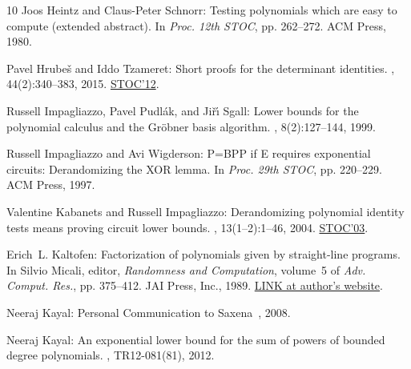 \documentclass[11pt]{article}
\numberwithin{equation}{section}
\theoremstyle{definition}
\theoremstyle{plain}
\begin{document}
\begin{thebibliography}{10}
{\sc Joos Heintz and Claus-Peter Schnorr}: Testing polynomials which are easy
  to compute (extended abstract).
\newblock In {\em Proc. 12th STOC}, pp. 262--272. ACM Press, 1980.
\newblock [\epfmtdoi{10.1145/800141.804674}]

{\sc Pavel Hrube\v{s} and Iddo Tzameret}: Short proofs for the determinant
  identities.
, 44(2):340--383, 2015.
\newblock \prelim \href{https://doi.org/10.1145/2213977.2213998}{STOC'12}.

{\sc Russell Impagliazzo, Pavel Pudl{\'{a}}k, and Ji{\v{r}}{\'{\i}} Sgall}:
  Lower bounds for the polynomial calculus and the {G}r{\"{o}}bner basis
  algorithm.
, 8(2):127--144, 1999.

{\sc Russell Impagliazzo and Avi Wigderson}: {P=BPP} if {E} requires
  exponential circuits: Derandomizing the {XOR} lemma.
\newblock In {\em Proc. 29th STOC}, pp. 220--229. ACM Press, 1997.
\newblock [\epfmtdoi{10.1145/258533.258590}]

{\sc Valentine Kabanets and Russell Impagliazzo}: Derandomizing polynomial
  identity tests means proving circuit lower bounds.
, 13(1--2):1--46, 2004.
\newblock \prelim \href{https://doi.org/10.1145/780542.780595}{STOC'03}.
\newblock [\epfmtdoi{10.1007/s00037-004-0182-6}]

{\sc Erich~L. Kaltofen}: Factorization of polynomials given by straight-line
  programs.
\newblock In {\sc Silvio Micali}, editor, {\em Randomness and Computation},
  volume~5 of {\em Adv. Comput. Res.}, pp. 375--412. {JAI} Press, Inc., 1989.
\newblock
  \href{https://users.cs.duke.edu/~elk27/bibliography/89/Ka89_slpfac.pdf}{LINK
  at author's website}.

{\sc Neeraj Kayal}: Personal Communication to Saxena~\cite{Saxena08}, 2008.

{\sc Neeraj Kayal}: An exponential lower bound for the sum of powers of bounded
  degree polynomials.
, TR12-081(81), 2012.


\end{thebibliography}
\end{document}
